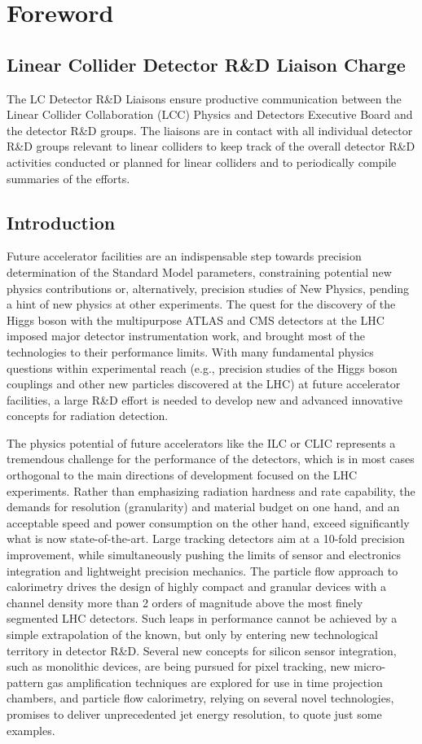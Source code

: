 \documentclass[10pt,final]{report}
\begin{document}
\tableofcontents
\chapter*{Foreword}
\section*{Linear Collider Detector R\&D Liaison Charge}
The LC Detector R\&D Liaisons ensure productive communication between the Linear Collider Collaboration (LCC) Physics and Detectors Executive Board and the detector R\&D groups. The liaisons are in contact with all individual detector R\&D groups relevant to linear colliders to keep track of the overall detector R\&D activities conducted or planned for linear colliders and to periodically compile summaries of the efforts.

\section*{Introduction}
Future accelerator facilities are an indispensable step towards precision determination of the Standard Model parameters, constraining potential new physics contributions or, alternatively, precision studies of New Physics, pending a hint of new physics at other experiments. The quest for the discovery of the Higgs boson with the multipurpose ATLAS and CMS detectors at the LHC imposed major detector instrumentation work, and brought most of the technologies to their performance limits. With many fundamental physics questions within experimental reach (e.g., precision studies of the Higgs boson couplings and other new particles discovered at the LHC) at future accelerator facilities, a large R\&D effort is needed to develop new and advanced innovative concepts for radiation detection.

The physics potential of future accelerators like the ILC or CLIC represents a tremendous challenge for the performance of the detectors, which is in most cases orthogonal to the main directions of development focused on the LHC experiments. Rather than emphasizing radiation hardness and rate capability, the demands for resolution (granularity) and material budget on one hand, and an acceptable speed and power consumption on the other hand, exceed significantly what is now state-of-the-art. Large tracking detectors aim at a 10-fold precision improvement, while simultaneously pushing the limits of sensor and electronics integration and lightweight precision mechanics. The particle flow approach to calorimetry drives the design of highly compact and granular devices with a channel density more than 2 orders of magnitude above the most finely segmented LHC detectors. Such leaps in performance cannot be achieved by a simple extrapolation of the known, but only by entering new technological territory in detector R\&D. Several new concepts for silicon sensor integration, such as monolithic devices, are being pursued for pixel tracking, new micro-pattern gas amplification techniques are explored for use in time projection chambers, and particle flow calorimetry, relying on several novel technologies, promises to deliver unprecedented jet energy resolution, to quote just some examples.
\end{document}
